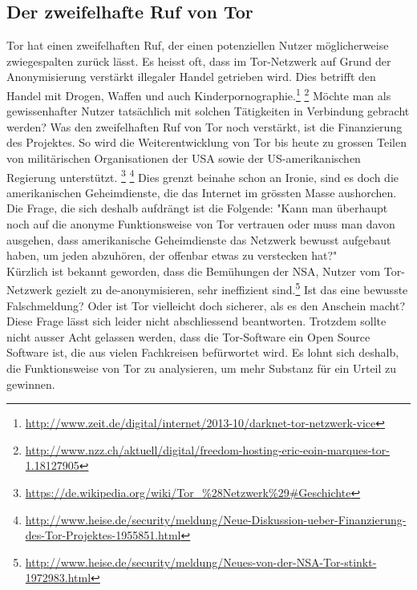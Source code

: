 \subsection{Der zweifelhafte Ruf von Tor}
Tor hat einen zweifelhaften Ruf, der einen potenziellen Nutzer möglicherweise zwiegespalten zurück lässt.
Es heisst oft, dass im Tor-Netzwerk auf Grund der Anonymisierung verstärkt illegaler Handel getrieben wird.
Dies betrifft den Handel mit Drogen, Waffen und auch Kinderpornographie.\footnote{\url{http://www.zeit.de/digital/internet/2013-10/darknet-tor-netzwerk-vice}} \footnote{\url{http://www.nzz.ch/aktuell/digital/freedom-hosting-eric-eoin-marques-tor-1.18127905}}
Möchte man als gewissenhafter Nutzer tatsächlich mit solchen Tätigkeiten in Verbindung gebracht werden?
Was den zweifelhaften Ruf von Tor noch verstärkt, ist die Finanzierung des Projektes.
So wird die Weiterentwicklung von Tor bis heute zu grossen Teilen von militärischen Organisationen der USA sowie der US-amerikanischen Regierung  unterstützt.
\footnote{\url{https://de.wikipedia.org/wiki/Tor_\%28Netzwerk\%29\#Geschichte}}
\footnote{\url{http://www.heise.de/security/meldung/Neue-Diskussion-ueber-Finanzierung-des-Tor-Projektes-1955851.html}}
Dies grenzt beinahe schon an Ironie, sind es doch die amerikanischen Geheimdienste, die das Internet im grössten Masse aushorchen. Die Frage, die sich deshalb aufdrängt ist die Folgende: "Kann man überhaupt noch auf die anonyme Funktionsweise von Tor vertrauen oder muss man davon ausgehen, dass amerikanische Geheimdienste das Netzwerk bewusst aufgebaut haben, um jeden abzuhören, der offenbar etwas zu verstecken hat?"
\\
Kürzlich ist bekannt geworden, dass die Bemühungen der NSA, Nutzer vom Tor-Netzwerk gezielt zu de-anonymisieren, sehr ineffizient sind.\footnote{\url{http://www.heise.de/security/meldung/Neues-von-der-NSA-Tor-stinkt-1972983.html}}
Ist das eine bewusste Falschmeldung? Oder ist Tor vielleicht doch sicherer, als es den Anschein macht? Diese Frage lässt sich leider nicht abschliessend beantworten. Trotzdem sollte nicht ausser Acht gelassen werden, dass die Tor-Software ein Open Source Software ist, die aus vielen Fachkreisen befürwortet wird. Es lohnt sich deshalb, die Funktionsweise von Tor zu analysieren, um mehr Substanz für ein Urteil zu gewinnen.

